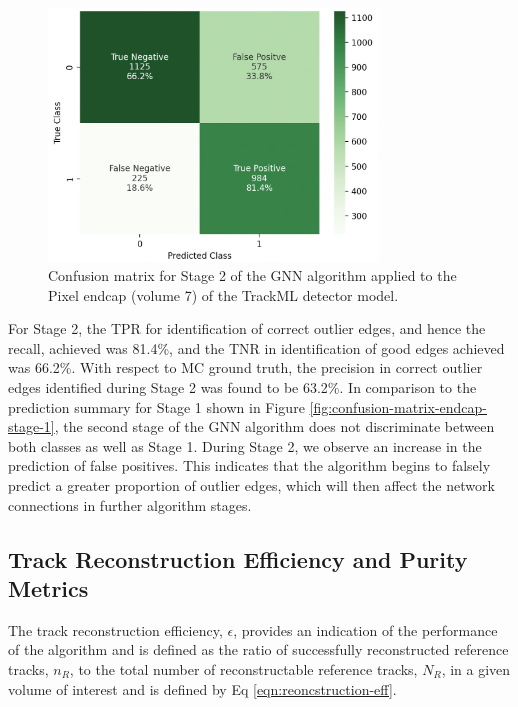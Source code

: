 \begin{figure}[htbp]
    \centering
    \includegraphics[width=0.78\textwidth]{images/7-results/confusion_matrix_endcap_stage_2.png}
    \caption{Confusion matrix for Stage 2 of the GNN algorithm applied to the Pixel endcap (volume 7) of the TrackML detector model.}
    \label{fig:confusion-matrix-endcap-stage-2}%
\end{figure}


For Stage 2, the TPR for identification of correct outlier edges, and hence the recall, achieved was 81.4\%, and the TNR in identification of good edges achieved was 66.2\%. With respect to MC ground truth, the precision in correct outlier edges identified during Stage 2 was found to be 63.2\%. In comparison to the prediction summary for Stage 1 shown in Figure \ref{fig:confusion-matrix-endcap-stage-1}, the second stage of the GNN algorithm does not discriminate between both classes as well as Stage 1. During Stage 2, we observe an increase in the prediction of false positives. This indicates that the algorithm begins to falsely predict a greater proportion of outlier edges, which will then affect the network connections in further algorithm stages.






\subsection{Track Reconstruction Efficiency and Purity Metrics}

The track reconstruction efficiency, $\epsilon$, provides an indication of the performance of the algorithm and is defined as the ratio of successfully reconstructed reference tracks, $n_R$, to the total number of reconstructable reference tracks, $N_R$, in a given volume of interest and is defined by Eq \eqref{eqn:reoncstruction-eff}. 


